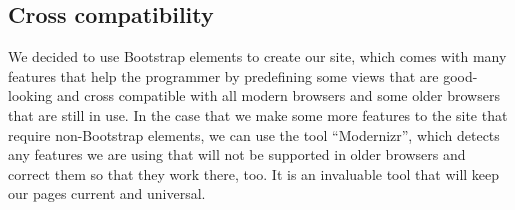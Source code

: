 \subsection{Cross compatibility}
We decided to use Bootstrap elements to create our site, which comes with many features that help the programmer by predefining some views that are good-looking and cross compatible with all modern browsers and some older browsers that are still in use. In the case that we make some more features to the site that require non-Bootstrap elements, we can use the tool ``Modernizr'', which detects any features we are using that will not be supported in older browsers and correct them so that they work there, too. It is an invaluable tool that will keep our pages current and universal.

